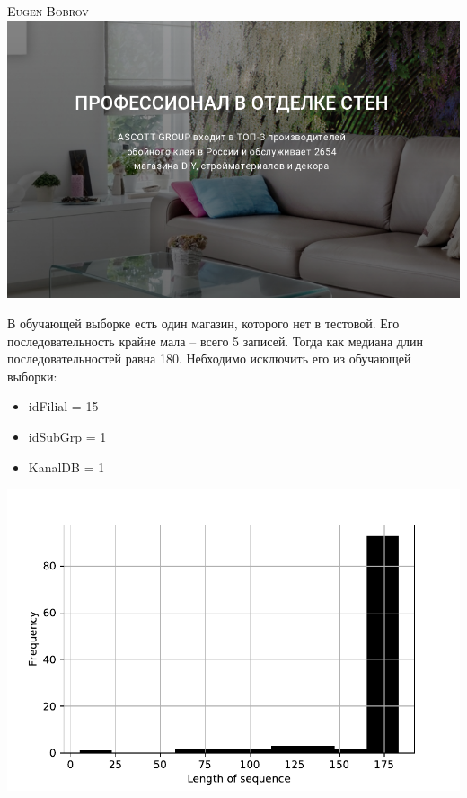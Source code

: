 \documentclass[russian, 10pt]{beamer}
\begin{document}
\begin{frame}
\centering
\textsc{\textcolor{black}{Eugen Bobrov}}\\[2mm]
\includegraphics[scale=0.35]{images/2.png}
\end{frame}

\begin{frame}
В обучающей выборке есть один магазин, которого нет в тестовой. Его последовательность крайне мала -- всего 5 записей. Тогда как медиана длин последовательностей равна 180. Небходимо исключить его из обучающей выборки:

\begin{itemize}

\item idFilial = 15
\item idSubGrp = 1
\item KanalDB = 1

\end{itemize}

\includegraphics[scale=0.5]{images/sizes.pdf}
\end{frame}
\end{document}
